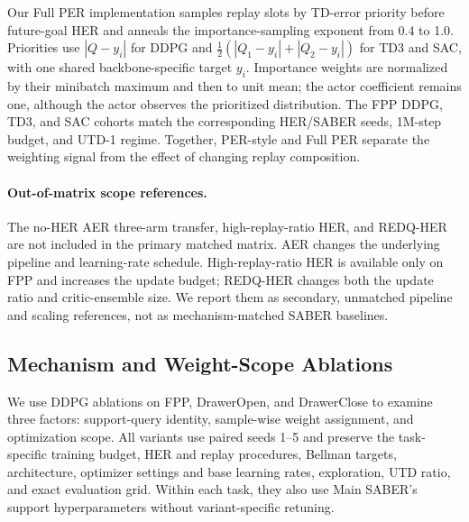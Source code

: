 \documentclass[letterpaper]{article}
\begin{document}
Our Full PER implementation samples replay slots by TD-error priority before future-goal HER and anneals the importance-sampling exponent from 0.4 to 1.0. Priorities use \(|Q-y_i|\) for DDPG and \(\tfrac{1}{2}(|Q_1-y_i|+|Q_2-y_i|)\) for TD3 and SAC, with one shared backbone-specific target \(y_i\). Importance weights are normalized by their minibatch maximum and then to unit mean; the actor coefficient remains one, although the actor observes the prioritized distribution. The FPP DDPG, TD3, and SAC cohorts match the corresponding HER/SABER seeds, 1M-step budget, and UTD-1 regime. Together, PER-style and Full PER separate the weighting signal from the effect of changing replay composition.

\paragraph{Out-of-matrix scope references.}
The no-HER AER three-arm transfer, high-replay-ratio HER, and REDQ-HER are not included in the primary matched matrix. AER changes the underlying pipeline and learning-rate schedule. High-replay-ratio HER is available only on FPP and increases the update budget; REDQ-HER changes both the update ratio and critic-ensemble size. We report them as secondary, unmatched pipeline and scaling references, not as mechanism-matched SABER baselines.

\subsection{Mechanism and Weight-Scope Ablations}

We use DDPG ablations on FPP, DrawerOpen, and DrawerClose to examine three factors: support-query identity, sample-wise weight assignment, and optimization scope. All variants use paired seeds 1--5 and preserve the task-specific training budget, HER and replay procedures, Bellman targets, architecture, optimizer settings and base learning rates, exploration, UTD ratio, and exact evaluation grid. Within each task, they also use Main SABER's support hyperparameters without variant-specific retuning.
\end{document}
